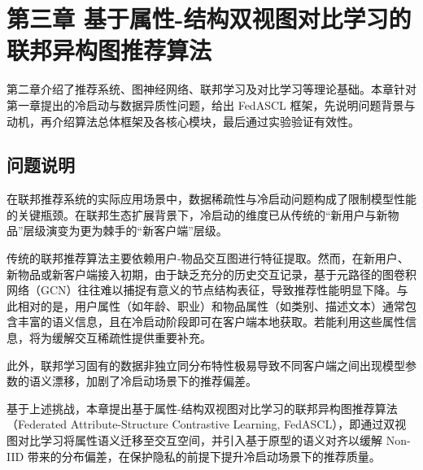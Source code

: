 \newpage
\section{第三章\texorpdfstring{\quad}{} 基于属性-结构双视图对比学习的联邦异构图推荐算法}
\label{chap:fedascl}
\setcounter{section}{3} \setcounter{subsection}{0}

第二章介绍了推荐系统、图神经网络、联邦学习及对比学习等理论基础。本章针对第一章提出的冷启动与数据异质性问题，给出 FedASCL 框架，先说明问题背景与动机，再介绍算法总体框架及各核心模块，最后通过实验验证有效性。

\subsection{问题说明}
\label{sec:motivation}
在联邦推荐系统的实际应用场景中，数据稀疏性与冷启动问题构成了限制模型性能的关键瓶颈。在联邦生态扩展背景下，冷启动的维度已从传统的“新用户与新物品”层级演变为更为棘手的“新客户端”层级\cite{zhang2024ifedrec}。

传统的联邦推荐算法主要依赖用户-物品交互图进行特征提取。然而，在新用户、新物品或新客户端接入初期，由于缺乏充分的历史交互记录，基于元路径的图卷积网络（GCN）往往难以捕捉有意义的节点结构表征，导致推荐性能明显下降。与此相对的是，用户属性（如年龄、职业）和物品属性（如类别、描述文本）通常包含丰富的语义信息，且在冷启动阶段即可在客户端本地获取。若能利用这些属性信息，将为缓解交互稀疏性提供重要补充\cite{sang2025hgcl}。

此外，联邦学习固有的数据非独立同分布特性极易导致不同客户端之间出现模型参数的语义漂移，加剧了冷启动场景下的推荐偏差\cite{tan2023fedstar}。

基于上述挑战，本章提出基于属性-结构双视图对比学习的联邦异构图推荐算法（Federated Attribute-Structure Contrastive Learning, FedASCL），即通过双视图对比学习将属性语义迁移至交互空间，并引入基于原型的语义对齐以缓解 Non-IID 带来的分布偏差，在保护隐私的前提下提升冷启动场景下的推荐质量\cite{wang2025fedpcl}。

